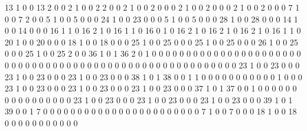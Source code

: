 13
1
0
0
13
2
0
0
2
1
0
0
2
2
0
0
2
1
0
0
2
0
0
0
2
1
0
0
2
0
0
0
2
1
0
0
2
0
0
0
7
1
0
0
7
2
0
0
5
1
0
0
5
0
0
0
24
1
0
0
23
0
0
0
5
1
0
0
5
0
0
0
28
1
0
0
28
0
0
0
14
1
0
0
14
0
0
0
16
1
1
0
16
2
1
0
16
1
1
0
16
0
1
0
16
2
1
0
16
2
1
0
16
2
1
0
16
1
1
0
20
1
0
0
20
0
0
0
18
1
0
0
18
0
0
0
25
1
0
0
25
0
0
0
25
1
0
0
25
0
0
0
26
1
0
0
25
0
0
0
25
1
0
0
25
2
0
0
36
1
0
1
36
2
0
1
0
0
0
0
0
0
0
0
0
0
0
0
0
0
0
0
0
0
0
0
0
0
0
0
0
0
0
0
0
0
0
0
0
0
0
0
0
0
0
0
0
0
0
0
0
0
0
0
0
0
0
0
0
0
0
0
23
1
0
0
23
0
0
0
23
1
0
0
23
0
0
0
23
1
0
0
23
0
0
0
38
1
0
1
38
0
0
1
1
0
0
0
0
0
0
0
0
0
0
0
1
0
0
0
23
1
0
0
23
0
0
0
23
1
0
0
23
0
0
0
23
1
0
0
23
0
0
0
37
1
0
1
37
0
0
1
0
0
0
0
0
0
0
0
0
0
0
0
0
0
0
0
23
1
0
0
23
0
0
0
23
1
0
0
23
0
0
0
23
1
0
0
23
0
0
0
39
1
0
1
39
0
0
1
7
0
0
0
0
0
0
0
0
0
0
0
0
0
0
0
0
0
0
0
0
0
0
0
7
1
0
0
7
0
0
0
18
1
0
0
18
0
0
0
0
0
0
0
0
0
0
0
